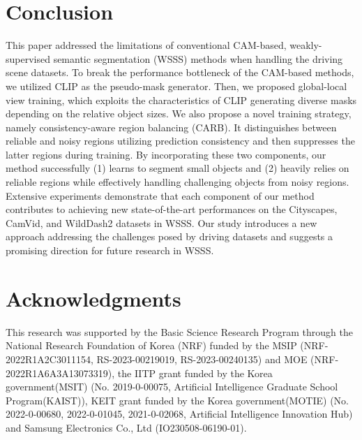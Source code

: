\documentclass[letterpaper]{article} %
\begin{document}
\section{Conclusion}
This paper addressed the limitations of conventional CAM-based, weakly-supervised semantic segmentation (WSSS) methods when handling the driving scene datasets. To break the performance bottleneck of the CAM-based methods, we utilized CLIP as the pseudo-mask generator. Then, we proposed global-local view training, which exploits the characteristics of CLIP generating diverse masks depending on the relative object sizes. We also propose a novel training strategy, namely consistency-aware region balancing (CARB). It distinguishes between reliable and noisy regions utilizing prediction consistency and then suppresses the latter regions during training. By incorporating  these two components, our method successfully (1) learns to segment small objects and (2) heavily relies on reliable regions while effectively handling challenging objects from noisy regions. Extensive experiments demonstrate that each component of our method contributes to achieving new state-of-the-art performances on the Cityscapes, CamVid, and WildDash2 datasets in WSSS. Our study introduces a new approach addressing the challenges posed by driving datasets and suggests a promising direction for future research in WSSS.

\section*{Acknowledgments}
This research was supported by the Basic Science Research Program through the National Research Foundation of Korea (NRF) funded by the MSIP (NRF-2022R1A2C3011154, RS-2023-00219019, RS-2023-00240135) and MOE (NRF-2022R1A6A3A13073319), the IITP grant funded by the Korea government(MSIT) (No. 2019-0-00075, Artificial Intelligence Graduate School Program(KAIST)), KEIT grant funded by the Korea government(MOTIE) (No. 2022-0-00680, 2022-0-01045, 2021-0-02068, Artificial Intelligence Innovation Hub) and Samsung Electronics Co., Ltd (IO230508-06190-01).


\end{document}
